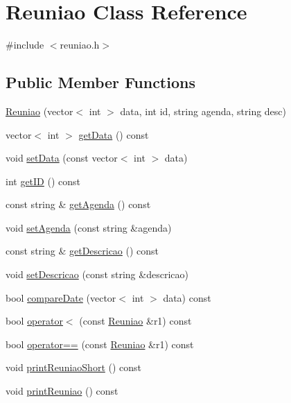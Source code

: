 \hypertarget{class_reuniao}{}\section{Reuniao Class Reference}
\label{class_reuniao}


{\ttfamily \#include $<$reuniao.\+h$>$}

\subsection*{Public Member Functions}
\begin{DoxyCompactItemize}
\item 
\hyperlink{class_reuniao_ad0fe5ba861f36f1a89cd25352c894a8b}{Reuniao} (vector$<$ int $>$ data, int id, string agenda, string desc)
\item 
vector$<$ int $>$ \hyperlink{class_reuniao_af88fe0e1665a47c34e72ed90b84f785e}{get\+Data} () const
\item 
void \hyperlink{class_reuniao_a36323d2065772e005fe9609e84289fd5}{set\+Data} (const vector$<$ int $>$ data)
\item 
int \hyperlink{class_reuniao_a8baeb122e48d0f90cba40407f97e278e}{get\+ID} () const
\item 
const string \& \hyperlink{class_reuniao_ac74333d543eb7ef5f9042b9111e3eac1}{get\+Agenda} () const
\item 
void \hyperlink{class_reuniao_abbd435487bf4dcec1d5b030bebe92528}{set\+Agenda} (const string \&agenda)
\item 
const string \& \hyperlink{class_reuniao_a2d373c8189382b2eeafbecbdb8f5e0d0}{get\+Descricao} () const
\item 
void \hyperlink{class_reuniao_aa67dc8030f5c5df36396127bb25a369e}{set\+Descricao} (const string \&descricao)
\item 
bool \hyperlink{class_reuniao_a132c677f5296fc9024ef99c811d27101}{compare\+Date} (vector$<$ int $>$ data) const
\item 
bool \hyperlink{class_reuniao_a66853a7c1b5d70e529b1b0964f21fc62}{operator$<$} (const \hyperlink{class_reuniao}{Reuniao} \&r1) const
\item 
bool \hyperlink{class_reuniao_a0ee9805621e0e6d0f28fa14a7a623eab}{operator==} (const \hyperlink{class_reuniao}{Reuniao} \&r1) const
\item 
void \hyperlink{class_reuniao_aaebc1a93242f44e618292f2e946cd9ff}{print\+Reuniao\+Short} () const
\item 
void \hyperlink{class_reuniao_a0eb3204ecc596f02362fec03d414f940}{print\+Reuniao} () const
\end{DoxyCompactItemize}


